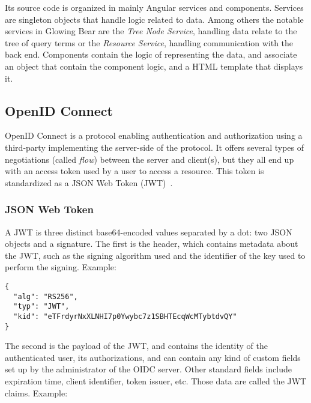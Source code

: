 Its source code is organized in mainly Angular services and components.
Services are singleton objects that handle logic related to data.
Among others the notable services in Glowing Bear are the \emph{Tree Node Service}, handling data relate to the tree of query terms or the \emph{Resource Service}, handling communication with the back end.
Components contain the logic of representing the data, and associate an object that contain the component logic, and a HTML template that displays it.


\subsection{OpenID Connect}



OpenID Connect is a protocol enabling authentication and authorization using a third-party implementing the server-side of the protocol.
It offers several types of negotiations (called \emph{flow}) between the server and client(s), but they all end up with an access token used by a user to access a resource.
This token is standardized as a JSON Web Token (JWT)~\cite{todo}.

\subsubsection*{JSON Web Token}

A JWT is three distinct base64-encoded values separated by a dot: two JSON objects and a signature.
The first is the header, which contains metadata about the JWT, such as the signing algorithm used and the identifier of the key used to perform the signing.
Example:

\begin{samepage}
\begin{verbatim}
{
  "alg": "RS256",
  "typ": "JWT",
  "kid": "eTFrdyrNxXLNHI7p0Ywybc7z1SBHTEcqWcMTybtdvQY"
}
\end{verbatim}
\end{samepage}

The second is the payload of the JWT, and contains the identity of the authenticated user, its authorizations, and can contain any kind of custom fields set up by the administrator of the OIDC server.
Other standard fields include expiration time, client identifier, token issuer, etc.
Those data are called the JWT claims.
Example:


